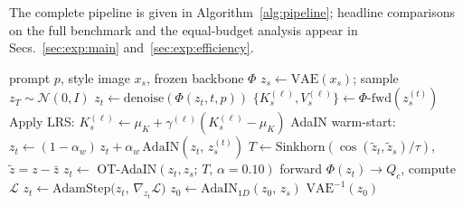 The complete pipeline is given in Algorithm~\ref{alg:pipeline};
headline comparisons on the full benchmark and the equal-budget
analysis appear in Secs.~\ref{sec:exp:main} and~\ref{sec:exp:efficiency}.

\begin{algorithm}[t]
  \caption{Hyperion Pipeline}  %
  \label{alg:pipeline}
  \begin{algorithmic}[1]
    \Require prompt $p$, style image $x_s$, frozen backbone $\Phi$
    \State $z_s \leftarrow \text{VAE}(x_s)$;\quad
           sample $z_T \sim \mathcal{N}(0,I)$
      \State $z_t \leftarrow \text{denoise}(\Phi(z_t, t, p))$
        \State $\{K_s^{(\ell)}, V_s^{(\ell)}\}
               \leftarrow \Phi\text{-fwd}(z_s^{(t)})$
        \State Apply LRS: $K_s^{(\ell)} \leftarrow
               \mu_K + \gamma^{(\ell)}(K_s^{(\ell)}-\mu_K)$
        \State AdaIN warm-start: $z_t \leftarrow (1{-}\alpha_w)\,z_t +
               \alpha_w\,\mathrm{AdaIN}(z_t,\, z_s^{(t)})$
        \State $T \leftarrow \text{Sinkhorn}(\cos(\tilde{z}_t, \tilde{z}_s)/\tau)$,
               $\tilde{z}{=}z{-}\bar{z}$
        \State $z_t \leftarrow$ OT-AdaIN$(z_t, z_s;\, T,\, \alpha{=}0.10)$
          \State forward $\Phi(z_t)\to Q_c$, compute $\mathcal{L}$
          \State $z_t \leftarrow \mathrm{AdamStep}\bigl(z_t,\,
                 \nabla_{z_t}\mathcal{L}\bigr)$
        \EndFor
      \EndIf
    \EndFor
    \State $z_0 \leftarrow \mathrm{AdaIN}_{1D}(z_0,\, z_s)$
    \State \Return $\text{VAE}^{-1}(z_0)$
  \end{algorithmic}
\end{algorithm}


